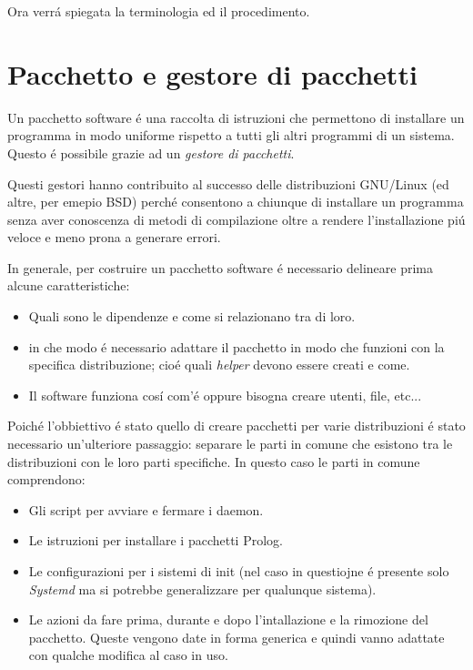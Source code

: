 \documentclass[10pt,titlepage,twoside,a4paper]{report}
\begin{document}
Ora verr\'a spiegata la terminologia ed il procedimento.

\section{Pacchetto e gestore di pacchetti} \label{pacchetto-e-gestore-di-pacchetti}
Un pacchetto software \'e una raccolta di istruzioni che permettono di 
installare un programma in modo uniforme rispetto a tutti gli altri programmi 
di un sistema. Questo \'e possibile grazie ad un \emph{gestore di 
pacchetti}.

Questi gestori hanno contribuito al successo delle distribuzioni GNU/Linux (ed 
altre, per emepio BSD) perch\'e consentono a chiunque di installare un 
programma senza aver conoscenza di metodi di compilazione oltre a rendere 
l'installazione pi\'u veloce e meno prona a generare errori.

In generale, per costruire un pacchetto software \'e necessario delineare prima 
alcune caratteristiche:
\begin{itemize}
    \item Quali sono le dipendenze e come si relazionano tra di loro.
    \item in che modo \'e necessario adattare il pacchetto in modo che funzioni 
          con la specifica distribuzione; cio\'e quali \emph{helper} devono 
essere creati e come.
    \item Il software funziona cos\'i com'\'e oppure bisogna creare utenti, 
file, etc...
\end{itemize}

Poich\'e l'obbiettivo \'e stato quello di creare pacchetti per varie 
distribuzioni \'e stato necessario un'ulteriore passaggio: separare le parti in 
comune che esistono tra le distribuzioni con le loro parti specifiche. In 
questo caso le parti in comune comprendono:
\begin{itemize}
    \item Gli script per avviare e fermare i daemon.
    \item Le istruzioni per installare i pacchetti Prolog.
    \item Le configurazioni per i sistemi di init (nel caso in questiojne \'e 
presente solo \emph{Systemd} ma si potrebbe generalizzare per qualunque 
sistema).
    \item Le azioni da fare prima, durante e dopo l'intallazione e la rimozione 
del pacchetto. Queste vengono date in forma generica e quindi vanno adattate 
con qualche modifica al caso in uso.
\end{itemize}
\end{document}
